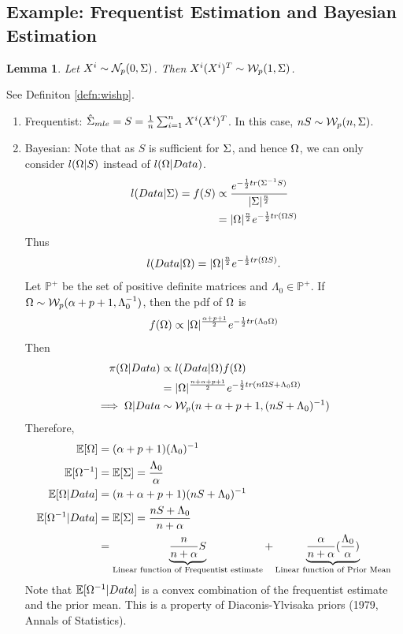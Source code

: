 \documentclass[12pt, leqno]{article}
\providecommand{\abs}[1]{\lvert#1\rvert}
\let\oldhat\hat
\renewcommand{\hat}[1]{\oldhat{{#1}}}
\def\s{\ensuremath\Sigma}
\def\om{\ensuremath\Omega}
\def\E{\ensuremath\mathbb{E}}
\newtheorem{lemma}{Lemma}[]
\begin{document}
\subsection{Example: Frequentist Estimation and Bayesian Estimation}
\begin{lemma} Let $X^i \sim 
\mathcal{N}_p(0,\s)$. Then
$X^i(X^i)^T \sim \mathcal{W}_p(1,\s)$.
\end{lemma}
See Definiton \ref{defn:wishp}.
\begin{enumerate}
\item Frequentist: $\hat{\s}_{mle} = S = 
  \frac{1}{n}\sum_{i=1}^nX^i(X^i)^T$. In this case, $nS \sim
  \mathcal{W}_p(n,\s)$.  
\item Bayesian: Note that as $S$ is sufficient for $\s$, and hence
  $\om$, we can only consider $l(\om|S)$ instead of $l(\om|Data)$. 
\begin{align*} l(Data|\s) = f(S) &\propto
                                             \frac{e^{-\frac{1}{2}tr(\s^{-1}S)}}{\abs{\s}^{\frac{n}{2}}}
                  \\ 
&={\abs{\om}^{\frac{n}{2}}}{e^{-\frac{1}{2}tr(\om S)}}
\end{align*}
Thus 
\[
l(Data|\om) = {\abs{\om}^{\frac{n}{2}}}{e^{-\frac{1}{2}tr(\om S)}}.
\]
Let $\mathbb{P}^+$ be the set of positive definite matrices and
$\Lambda_0 \in \mathbb{P}^+$. If $\om \sim
\mathcal{W}_p(\alpha+p+1, \Lambda_0^{-1})$, then the pdf of $\om$ is 
\[
f(\om) \propto
{\abs{\om}^{\frac{\alpha+p+1}{2}}}{e^{-\frac{1}{2}tr(\Lambda_0 \om )}}
\]
Then
\begin{align*}
\pi(\om|Data) &\propto l(Data|\om)f(\om) \\
&= {\abs{\om}^{\frac{n+\alpha+p+1}{2}}}{e^{-\frac{1}{2}tr(n \om S +
  \Lambda_0 \om )}} \\
\implies \om|Data &\sim \mathcal{W}_p(n+\alpha+p+1, (nS+\Lambda_0)^{-1})
\end{align*}
Therefore,
\begin{align*} 
\E[\om] &= (\alpha+p+1)(\Lambda_0)^{-1} \\
\E[\om^{-1}] &= \E[\s] = \frac{\Lambda_0}{\alpha} \\
\E[\om|Data] &= (n+\alpha+p+1)(nS+\Lambda_0)^{-1} \\
\E[\om^{-1}|Data] &= \E[\s] = \frac{nS+\Lambda_0}{n+\alpha} \\
&= \underbrace{\frac{n}{n+\alpha} S}_{\text{Linear function of Frequentist estimate}} + \underbrace{\frac{\alpha}{n+\alpha}
  (\frac{\Lambda_0}{\alpha})}_{\text{Linear function of Prior Mean}}
\end{align*}
Note that $\E[\om^{-1}|Data]$ is a convex combination of the
frequentist estimate and the prior mean. This is a property of
Diaconis-Ylvisaka priors (1979, Annals of Statistics).
\end{enumerate}
\end{document}
